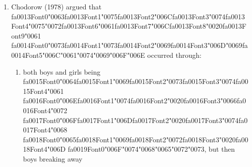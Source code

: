 \documentclass[12pt]{article}
\begin{document}
\begin{enumerate}[label=\arabic*.]
\begin{enumerate}[label=(\alph*)]
    \item {\char"0041}{\csname fa0010Font1\endcsname\char"006E}{\csname fa0010Font2\endcsname\char"0020}{\csname fa0010Font3\endcsname\char"0061} {\csname fa0011Font0\endcsname\char"0067}{\csname fa0011Font1\endcsname\char"0067}{\csname fa0011Font2\endcsname\char"0072}{\csname fa0011Font3\endcsname\char"0065} {\csname fa0012Font0\endcsname\char"0067}{\csname fa0012Font1\endcsname\char"0061}{\csname fa0012Font2\endcsname\char"0074}{\csname fa0012Font3\endcsname\char"0065}
\end{enumerate}
\item Chodorow (1978) argued that {\csname fa0013Font0\endcsname\char"0063}{\csname fa0013Font1\endcsname\char"0075}{\csname fa0013Font2\endcsname\char"006C}{\csname fa0013Font3\endcsname\char"0074}{\csname fa0013Font4\endcsname\char"0075}{\char"0072}{\csname fa0013Font6\endcsname\char"0061}{\csname fa0013Font7\endcsname\char"006C}{\csname fa0013Font8\endcsname\char"0020}{\csname fa0013Font9\endcsname\char"0061} {\csname fa0014Font0\endcsname\char"0073}{\csname fa0014Font1\endcsname\char"0073}{\csname fa0014Font2\endcsname\char"0069}{\csname fa0014Font3\endcsname\char"006D}{\char"0069}{\csname fa0014Font5\endcsname\char"006C}{\char"0061}{\char"0074}{\char"0069}{\char"006F}{\char"006E} occurred through:
\begin{enumerate}[label=(\alph*)]
    \item both boys and girls being {\csname fa0015Font0\endcsname\char"0064}{\csname fa0015Font1\endcsname\char"0069}{\csname fa0015Font2\endcsname\char"0073}{\csname fa0015Font3\endcsname\char"0074}{\csname fa0015Font4\endcsname\char"0061} {\csname fa0016Font0\endcsname\char"006E}{\csname fa0016Font1\endcsname\char"0074}{\csname fa0016Font2\endcsname\char"0020}{\csname fa0016Font3\endcsname\char"0066}{\csname fa0016Font4\endcsname\char"0072} {\csname fa0017Font0\endcsname\char"006F}{\csname fa0017Font1\endcsname\char"006D}{\csname fa0017Font2\endcsname\char"0020}{\csname fa0017Font3\endcsname\char"0074}{\csname fa0017Font4\endcsname\char"0068} {\csname fa0018Font0\endcsname\char"0065}{\csname fa0018Font1\endcsname\char"0069}{\csname fa0018Font2\endcsname\char"0072}{\csname fa0018Font3\endcsname\char"0020}{\csname fa0018Font4\endcsname\char"006D} {\csname fa0019Font0\endcsname\char"006F}{\char"0074}{\char"0068}{\char"0065}{\char"0072}{\char"0073}, but then boys breaking away

\end{enumerate}
\end{enumerate}
\end{document}
